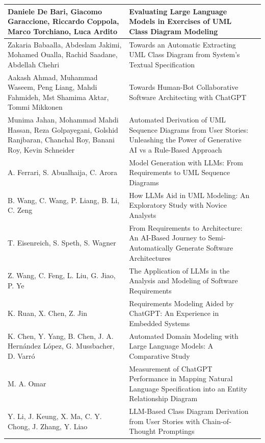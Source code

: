 \begin{longtable}{p{5cm} p{7.5cm} p{2.5cm}}
    Daniele De Bari, Giacomo Garaccione, Riccardo Coppola, Marco Torchiano, Luca Ardito & Evaluating Large Language Models in Exercises of UML Class Diagram Modeling & \cite{1deBari2024}\\ 
    \midrule
    Zakaria Babaalla, Abdeslam Jakimi, Mohamed Oualla, Rachid Saadane, Abdellah Chehri & Towards an Automatic Extracting UML Class Diagram from System's Textual Specification & \cite{2babaalla2024}\\ 
    \midrule
    Aakash Ahmad, Muhammad Waseem, Peng Liang, Mahdi Fahmideh, Mst Shamima Aktar, Tommi Mikkonen & Towards Human-Bot Collaborative Software Architecting with ChatGPT & \cite{3ahmad2023} \\ 
    \midrule
    Munima Jahan, Mohammad Mahdi Hassan, Reza Golpayegani, Golshid Ranjbaran, Chanchal Roy, Banani Roy, Kevin Schneider & Automated Derivation of UML Sequence Diagrams from User Stories: Unleashing the Power of Generative AI vs a Rule-Based Approach & \cite{4jahan2024} \\ 
    \midrule
    A. Ferrari, S. Abualhaija, C. Arora & Model Generation with LLMs: From Requirements to UML Sequence Diagrams & \cite{5ferrari2024}\\ 
    \midrule
    B. Wang, C. Wang, P. Liang, B. Li, C. Zeng & How LLMs Aid in UML Modeling: An Exploratory Study with Novice Analysts & \cite{6wang2024}\\ 
    \midrule
    T. Eisenreich, S. Speth, S. Wagner & From Requirements to Architecture: An AI-Based Journey to Semi-Automatically Generate Software Architectures & \cite{7eisenreich2024}\\ 
    \midrule
    Z. Wang, C. Feng, L. Liu, G. Jiao, P. Ye & The Application of LLMs in the Analysis and Modeling of Software Requirements & \cite{8z_wang2024}\\ 
    \midrule
    K. Ruan, X. Chen, Z. Jin & Requirements Modeling Aided by ChatGPT: An Experience in Embedded Systems & \cite{9ruan2023}\\ 
    \midrule
    K. Chen, Y. Yang, B. Chen, J. A. Hernández López, G. Mussbacher, D. Varró & Automated Domain Modeling with Large Language Models: A Comparative Study & \cite{10chen2023} \\ 
    \midrule
    M. A. Omar & Measurement of ChatGPT Performance in Mapping Natural Language Specification into an Entity Relationship Diagram & \cite{11omar2023}\\ 
    \midrule
    Y. Li, J. Keung, X. Ma, C. Y. Chong, J. Zhang, Y. Liao & LLM-Based Class Diagram Derivation from User Stories with Chain-of-Thought Promptings & \cite{12li2024}\\ 

\end{longtable}
